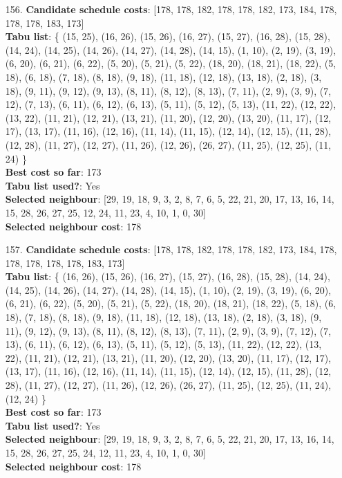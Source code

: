 \documentclass[fleqn]{article}
\begin{document}
\begin{itemize}
    \item[156.] \textbf{Candidate schedule costs}: [178, 178, 182, 178, 178, 182, 173, 184, 178, 178, 178, 183, 173] \\
    \textbf{Tabu list}: \{ (15, 25), (16, 26), (15, 26), (16, 27), (15, 27), (16, 28), (15, 28), (14, 24), (14, 25), (14, 26), (14, 27), (14, 28), (14, 15), (1, 10), (2, 19), (3, 19), (6, 20), (6, 21), (6, 22), (5, 20), (5, 21), (5, 22), (18, 20), (18, 21), (18, 22), (5, 18), (6, 18), (7, 18), (8, 18), (9, 18), (11, 18), (12, 18), (13, 18), (2, 18), (3, 18), (9, 11), (9, 12), (9, 13), (8, 11), (8, 12), (8, 13), (7, 11), (2, 9), (3, 9), (7, 12), (7, 13), (6, 11), (6, 12), (6, 13), (5, 11), (5, 12), (5, 13), (11, 22), (12, 22), (13, 22), (11, 21), (12, 21), (13, 21), (11, 20), (12, 20), (13, 20), (11, 17), (12, 17), (13, 17), (11, 16), (12, 16), (11, 14), (11, 15), (12, 14), (12, 15), (11, 28), (12, 28), (11, 27), (12, 27), (11, 26), (12, 26), (26, 27), (11, 25), (12, 25), (11, 24) \} \\
    \textbf{Best cost so far}: 173 \\
    \textbf{Tabu list used?}: Yes \\
    \textbf{Selected neighbour}: [29, 19, 18, 9, 3, 2, 8, 7, 6, 5, 22, 21, 20, 17, 13, 16, 14, 15, 28, 26, 27, 25, 12, 24, 11, 23, 4, 10, 1, 0, 30] \\
    \textbf{Selected neighbour cost}: 178
      

    \item[157.] \textbf{Candidate schedule costs}: [178, 178, 182, 178, 178, 182, 173, 184, 178, 178, 178, 178, 178, 183, 173] \\
    \textbf{Tabu list}: \{ (16, 26), (15, 26), (16, 27), (15, 27), (16, 28), (15, 28), (14, 24), (14, 25), (14, 26), (14, 27), (14, 28), (14, 15), (1, 10), (2, 19), (3, 19), (6, 20), (6, 21), (6, 22), (5, 20), (5, 21), (5, 22), (18, 20), (18, 21), (18, 22), (5, 18), (6, 18), (7, 18), (8, 18), (9, 18), (11, 18), (12, 18), (13, 18), (2, 18), (3, 18), (9, 11), (9, 12), (9, 13), (8, 11), (8, 12), (8, 13), (7, 11), (2, 9), (3, 9), (7, 12), (7, 13), (6, 11), (6, 12), (6, 13), (5, 11), (5, 12), (5, 13), (11, 22), (12, 22), (13, 22), (11, 21), (12, 21), (13, 21), (11, 20), (12, 20), (13, 20), (11, 17), (12, 17), (13, 17), (11, 16), (12, 16), (11, 14), (11, 15), (12, 14), (12, 15), (11, 28), (12, 28), (11, 27), (12, 27), (11, 26), (12, 26), (26, 27), (11, 25), (12, 25), (11, 24), (12, 24) \} \\
    \textbf{Best cost so far}: 173 \\
    \textbf{Tabu list used?}: Yes \\
    \textbf{Selected neighbour}: [29, 19, 18, 9, 3, 2, 8, 7, 6, 5, 22, 21, 20, 17, 13, 16, 14, 15, 28, 26, 27, 25, 24, 12, 11, 23, 4, 10, 1, 0, 30] \\
    \textbf{Selected neighbour cost}: 178
      


\end{itemize}
\end{document}
